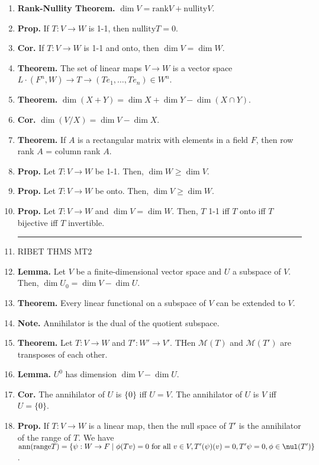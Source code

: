 \begin{enumerate}
	\item \textbf{Rank-Nullity Theorem. } $\dim V = \textrm{rank}V + \textrm{nullity}V$. 
	\item \textbf{Prop. } If $T: V \to W$ is 1-1, then $\textrm{nullity}T = 0$. 
	\item \textbf{Cor. } If $T: V \to W$ is 1-1 and onto, then $\dim V = \dim W$. 
	\item \textbf{Theorem. } The set of linear maps $V \to W$ is a vector space $L \cdot (F^n,W) \to T \longrightarrow (Te_1,\dots,Te_n) \in W^n$. 
	\item \textbf{Theorem. } $\dim (X+Y) = \dim X + \dim Y - \dim (X \cap Y)$. 
	\item \textbf{Cor. } $\dim (V/X) = \dim V - \dim X$. 
	\item \textbf{Theorem. } If $A$ is a rectangular matrix with elements in a field $F$, then row rank $A$ = column rank $A$. 
	\item \textbf{Prop. } Let $T: V \to W$ be 1-1. Then, $\dim W \geq \dim V$. 
	\item \textbf{Prop. } Let $T: V \to W$ be onto. Then, $\dim V \geq \dim W$. 
	\item \textbf{Prop. } Let $T: V \to W$ and $\dim V = \dim W$. Then, $T$ 1-1 iff $T$ onto iff $T$ bijective iff $T$ invertible. 
	\begin{center}
		\hrule
	\end{center}
	\item RIBET THMS MT2
	\item \textbf{Lemma. } Let $V$ be a finite-dimensional vector space and $U$ a subspace of $V$. Then, $\dim U_0 = \dim V - \dim U$. 
	\item \textbf{Theorem. } Every linear functional on a subspace of $V$ can be extended to $V$. 
	\item \textbf{Note. } Annihilator is the dual of the quotient subspace. 
	\item \textbf{Theorem. } Let $T: V \to W$ and $T': W' \to V'$. THen $\mathscr{M}(T)$ and $\mathscr{M}(T')$ are transposes of each other. 
	\item \textbf{Lemma. } $U^0$ has dimension $\dim V - \dim U$. 
	\item \textbf{Cor. } The annihilator of $U$ is $\{0\}$ iff $U = V$. The annihilator of $U$ is $V$ iff $U = \{0\}$. 
	\item \textbf{Prop. } If $T: V \to W$ is a linear map, then the null space of $T'$ is the annihilator of the range of $T$. We have $\textrm{ann}(\textrm{range}T) = \{\psi: W \to F \mid \phi(Tv)=0 \textrm{ for all } v \in V, T'(\psi)(v)=0, T'\psi = 0, \phi \in \nul(T')\}$. 

\end{enumerate}
